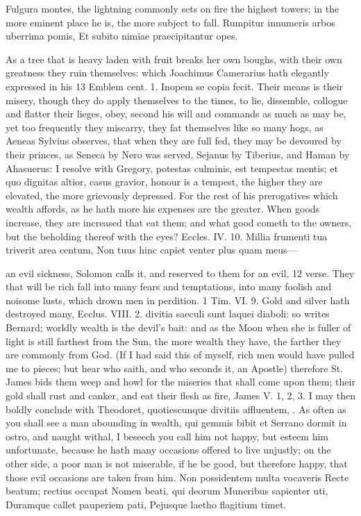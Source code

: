 {Fulgura montes, the lightning commonly sets on fire the highest towers;
in the more eminent place he is, the more subject to fall.
Rumpitur innumeris arbos uberrima pomis,
Et subito nimiae praecipitantur opes.

As a tree that is heavy laden with fruit breaks her own boughs, with
their own greatness they ruin themselves: which Joachimus Camerarius
hath elegantly expressed in his 13 Emblem cent. 1. Inopem se copia
fecit. Their means is their misery, though they do apply themselves to
the times, to lie, dissemble, collogue and flatter their lieges, obey,
second his will and commands as much as may be, yet too frequently they
miscarry, they fat themselves like so many hogs, as Aeneas
Sylvius observes, that when they are full fed, they may be devoured by
their princes, as Seneca by Nero was served, Sejanus by Tiberius, and
Haman by Ahasuerus: I resolve with Gregory, potestas culminis, est
tempestas mentis; et quo dignitas altior, casus gravior, honour is a
tempest, the higher they are elevated, the more grievously depressed.
For the rest of his prerogatives which wealth affords, as he hath more
his expenses are the greater. When goods increase, they are increased
that eat them; and what good cometh to the owners, but the beholding
thereof with the eyes? Eccles. IV. 10.
Millia frumenti tua triverit area centum,
Non tuus hinc capiet venter plus quam meus---

an evil sickness, Solomon calls it, and reserved to them for an evil,
12 verse. They that will be rich fall into many fears and temptations,
into many foolish and noisome lusts, which drown men in perdition. 1
Tim. VI. 9. Gold and silver hath destroyed many, Ecclus. VIII. 2.
divitia saeculi sunt laquei diaboli: so writes Bernard; worldly wealth
is the devil's bait: and as the Moon when she is fuller of light is
still farthest from the Sun, the more wealth they have, the farther
they are commonly from God. (If I had said this of myself, rich men
would have pulled me to pieces; but hear who saith, and who seconds it,
an Apostle) therefore St. James bids them weep and howl for the
miseries that shall come upon them; their gold shall rust and canker,
and eat their flesh as fire, James V. 1, 2, 3. I may then boldly
conclude with Theodoret, quotiescunque divitiis affluentem, \etc{}.
As often as you shall see a man abounding in wealth, qui gemmis bibit
et Serrano dormit in ostro, and naught withal, I beseech you call him
not happy, but esteem him unfortunate, because he hath many occasions
offered to live unjustly; on the other side, a poor man is not
miserable, if he be good, but therefore happy, that those evil
occasions are taken from him.
Non possidentem multa vocaveris
Recte beatum; rectius occupat
Nomen beati, qui deorum
Muneribus sapienter uti,
Duramque callet pauperiem pati,
Pejusque laetho flagitium timet.

}
